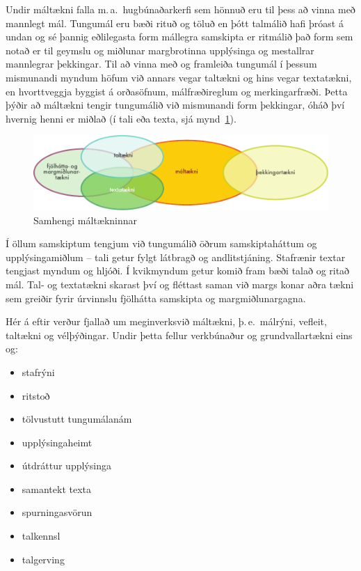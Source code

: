 \clearpage



\begin{multicols}{2}

Undir máltækni falla m.\,a.~hugbúnaðarkerfi sem hönnuð eru til þess að vinna með mannlegt mál. Tungumál eru bæði rituð og töluð en þótt talmálið hafi þróast á undan og sé þannig eðlilegasta form mállegra samskipta er ritmálið það form sem notað er til geymslu og miðlunar margbrotinna upplýsinga og mestallrar mannlegrar þekkingar. Til að vinna með og framleiða tungumál í þessum mismunandi myndum höfum við annars vegar taltækni og hins vegar textatækni, en hvorttveggja byggist á orðasöfnum, málfræðireglum og merkingarfræði. Þetta þýðir að máltækni tengir tungumálið við mismunandi form þekkingar, óháð því hvernig henni er miðlað (í tali eða texta, sjá mynd~\ref{fig:ltincontext_is}).

\begin{figure}[htb]
  \center
  \includegraphics[width=\textwidth]{../_media/icelandic/language_technologies}
  \caption{Samhengi máltækninnar}
  \label{fig:ltincontext_is}
\end{figure}

Í öllum samskiptum tengjum við tungumálið öðrum samskiptaháttum og upplýsingamiðlum -- tali getur fylgt látbragð og andlitstjáning. Stafrænir textar tengjast myndum og hljóði. Í kvikmyndum getur komið fram bæði talað og ritað mál. Tal- og textatækni skarast því og fléttast saman við margs konar aðra tækni sem greiðir fyrir úrvinnslu fjölhátta samskipta og margmiðlunargagna.

Hér á eftir verður fjallað um meginverksvið máltækni, þ.\,e.~málrýni, vefleit, taltækni og vélþýðingar. Undir þetta fellur verkbúnaður og grundvallartækni eins og:

\begin{itemize}
\item stafrýni
\item ritstoð
\item tölvustutt tungumálanám
\item upplýsingaheimt 
\item útdráttur upplýsinga
\item samantekt texta
\item spurningasvörun
\item talkennsl
\item talgerving
\end{itemize}


\end{multicols}
